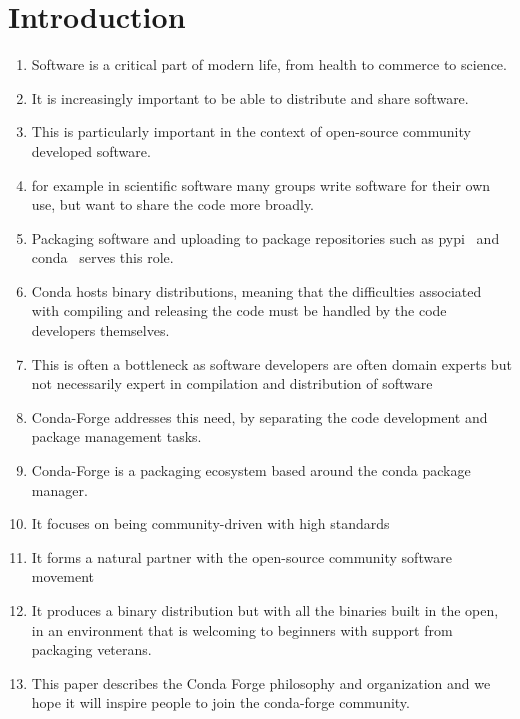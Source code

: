 \documentclass[fleqn,10pt,lineno]{wlpeerj} %
\newcounter{saveenumi}
\newcommand{\seti}{\setcounter{saveenumi}{\value{enumi}}}
\begin{document}
\section*{Introduction}
\begin{enumerate}
\item Software is a critical part of modern life, from health to commerce to science.
\item It is increasingly important to be able to distribute and share software.
\item This is particularly important in the context of open-source community developed software.
\item for example in scientific software many groups write software for their own use, but want to share the code more broadly.
\item Packaging software and uploading to package repositories such as pypi~\cite{??} and conda~\cite{???} serves this role.
\item Conda hosts binary distributions, meaning that the difficulties associated
with compiling and releasing the code must be handled by the code developers themselves.
\item This is often a bottleneck as software developers are often domain experts but not necessarily expert in compilation and distribution of software
\item Conda-Forge addresses this need, by separating the code development and package management tasks.
\item Conda-Forge is a packaging ecosystem based around the conda package
manager.  
\item It focuses on being community-driven with high standards
\item It forms a natural partner with the open-source community software movement
\item It produces a binary
distribution but with all the binaries built in the open, in an environment that is welcoming to beginners with support from packaging veterans.
\item This paper describes the Conda Forge philosophy and organization and we hope it will
inspire people to join the conda-forge community.
\end{enumerate}\seti
\end{document}
